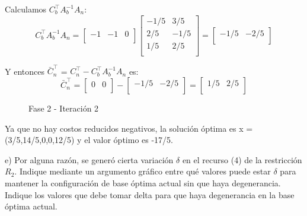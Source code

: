 \documentclass{article}
\begin{document}
\begin{flushleft}
		Calculamos $C_b^\intercal$$A_b^{-1}$$A_n$:
		\begin{equation*}
			C_b^\intercal A_b^{-1}A_n = \begin{bmatrix}
				-1 & -1 & 0 \\
			\end{bmatrix}
			\begin{bmatrix}
				-1/5 & 3/5  \\
				2/5 & -1/5 \\
				1/5 & 2/5  \\
			\end{bmatrix} = \begin{bmatrix}
				-1/5 & -2/5\\
			\end{bmatrix}
		\end{equation*}

		Y entonces \(\bar{C}_n^\intercal\) = \(C_n^\intercal - C_b^\intercal A_b^{-1} A_n\) es:
		\begin{equation*}
			\bar{C}_n^\intercal = \begin{bmatrix}
				0 & 0 \\
			\end{bmatrix} - \begin{bmatrix}
				-1/5 & -2/5\\
			\end{bmatrix} = \begin{bmatrix}
				1/5 & 2/5\\
			\end{bmatrix}
		\end{equation*}

		\begin{figure}[ht]
			\centering
			\caption{Fase 2 - Iteración 2}
			\label{fig:grafico}
		\end{figure}

		Ya que no hay costos reducidos negativos, la solución óptima es x = (3/5,14/5,0,0,12/5) y el valor óptimo es -17/5.\\
		\vspace{12cm}

		e) Por alguna razón, se generó cierta variación $\delta$ en el recurso (4) de la restricción $R_2$. Indique mediante un argumento gráfico entre qué valores puede estar $\delta$ para mantener la configuración de base óptima actual sin que haya degenerancia. Indique los valores que debe tomar delta para que haya degenerancia en la base óptima actual.\\
		\vspace{1cm}


\end{flushleft}
\end{document}
